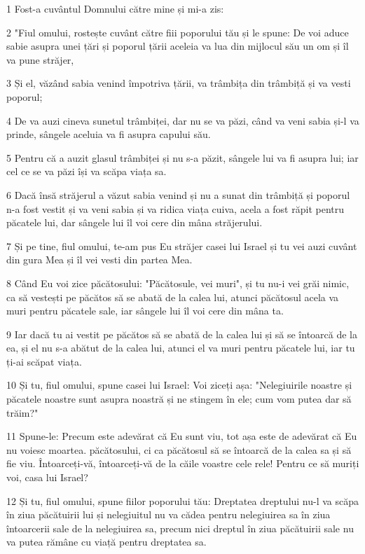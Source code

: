 \par 1 Fost-a cuvântul Domnului către mine și mi-a zis:
\par 2 "Fiul omului, rostește cuvânt către fiii poporului tău și le spune: De voi aduce sabie asupra unei țări și poporul țării aceleia va lua din mijlocul său un om și îl va pune străjer,
\par 3 Și el, văzând sabia venind împotriva țării, va trâmbița din trâmbiță și va vesti poporul;
\par 4 De va auzi cineva sunetul trâmbiței, dar nu se va păzi, când va veni sabia și-l va prinde, sângele aceluia va fi asupra capului său.
\par 5 Pentru că a auzit glasul trâmbiței și nu s-a păzit, sângele lui va fi asupra lui; iar cel ce se va păzi își va scăpa viața sa.
\par 6 Dacă însă străjerul a văzut sabia venind și nu a sunat din trâmbiță și poporul n-a fost vestit și va veni sabia și va ridica viața cuiva, acela a fost răpit pentru păcatele lui, dar sângele lui îl voi cere din mâna străjerului.
\par 7 Și pe tine, fiul omului, te-am pus Eu străjer casei lui Israel și tu vei auzi cuvânt din gura Mea și îl vei vesti din partea Mea.
\par 8 Când Eu voi zice păcătosului: "Păcătosule, vei muri", și tu nu-i vei grăi nimic, ca să vestești pe păcătos să se abată de la calea lui, atunci păcătosul acela va muri pentru păcatele sale, iar sângele lui îl voi cere din mâna ta.
\par 9 Iar dacă tu ai vestit pe păcătos să se abată de la calea lui și să se întoarcă de la ea, și el nu s-a abătut de la calea lui, atunci el va muri pentru păcatele lui, iar tu ți-ai scăpat viața.
\par 10 Și tu, fiul omului, spune casei lui Israel: Voi ziceți așa: "Nelegiuirile noastre și păcatele noastre sunt asupra noastră și ne stingem în ele; cum vom putea dar să trăim?"
\par 11 Spune-le: Precum este adevărat că Eu sunt viu, tot așa este de adevărat că Eu nu voiesc moartea. păcătosului, ci ca păcătosul să se întoarcă de la calea sa și să fie viu. Întoarceți-vă, întoarceți-vă de la căile voastre cele rele! Pentru ce să muriți voi, casa lui Israel?
\par 12 Și tu, fiul omului, spune fiilor poporului tău: Dreptatea dreptului nu-l va scăpa în ziua păcătuirii lui și nelegiuitul nu va cădea pentru nelegiuirea sa în ziua întoarcerii sale de la nelegiuirea sa, precum nici dreptul în ziua păcătuirii sale nu va putea rămâne cu viață pentru dreptatea sa.
